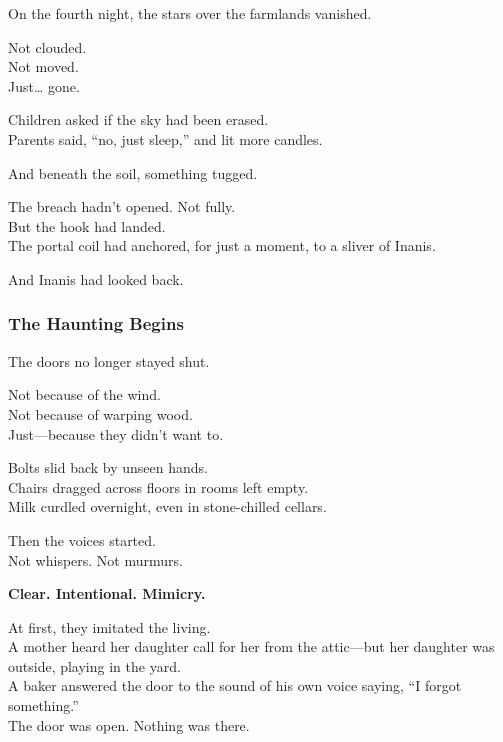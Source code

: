 \documentclass[12pt]{article}
\begin{document}
\vspace{0.5em}
On the fourth night, the stars over the farmlands vanished.

\vspace{0.5em}
Not clouded.\\
Not moved.\\
Just\ldots{} gone.

\vspace{0.5em}
Children asked if the sky had been erased.\\
Parents said, ``no, just sleep,'' and lit more candles.

\vspace{0.5em}
And beneath the soil, something tugged.

\vspace{0.5em}
The breach hadn’t opened. Not fully.\\
But the hook had landed.\\
The portal coil had anchored, for just a moment, to a sliver of Inanis.

\vspace{0.5em}
And Inanis had looked back.

\dotfill

\subsubsection*{The Haunting Begins}

The doors no longer stayed shut.

\vspace{0.5em}
Not because of the wind.\\
Not because of warping wood.\\
Just---because they didn’t want to.

\vspace{0.5em}
Bolts slid back by unseen hands.\\
Chairs dragged across floors in rooms left empty.\\
Milk curdled overnight, even in stone-chilled cellars.

\vspace{0.5em}
Then the voices started.\\
Not whispers. Not murmurs.

\vspace{0.5em}
\textbf{Clear. Intentional. Mimicry.}

\vspace{0.5em}
At first, they imitated the living.\\
A mother heard her daughter call for her from the attic---but her daughter was outside, playing in the yard.\\
A baker answered the door to the sound of his own voice saying, ``I forgot something.''\\
The door was open. Nothing was there.
\end{document}
